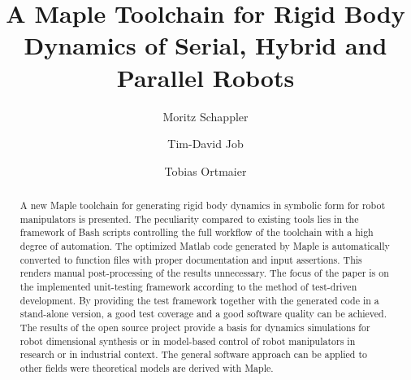 \documentclass[runningheads]{llncs}
\begin{document}
%
\title{A Maple Toolchain for Rigid Body Dynamics of Serial, Hybrid and Parallel Robots}%
%
%
\author{Moritz Schappler \and Tim-David Job \and Tobias Ortmaier}
%
%
%
\maketitle              %
%
\begin{abstract}
A new Maple toolchain for generating rigid body dynamics in symbolic form for robot manipulators is presented.
The peculiarity compared to existing tools lies in the framework of Bash scripts controlling the full workflow of the toolchain with a high degree of automation. 
The optimized Matlab code generated by Maple is automatically converted to function files with proper documentation and input assertions.
This renders manual post-processing of the results unnecessary.
The focus of the paper is on the implemented unit-testing framework according to the method of test-driven development.
By providing the test framework together with the generated code in a stand-alone version, a good test coverage and a good software quality can be achieved.
The results of the open source project provide a basis for dynamics simulations for robot dimensional synthesis or in model-based control of robot manipulators in research or in industrial context.
The general software approach can be applied to other fields were theoretical models are derived with Maple.

\end{abstract}
%
%
%
\end{document}
